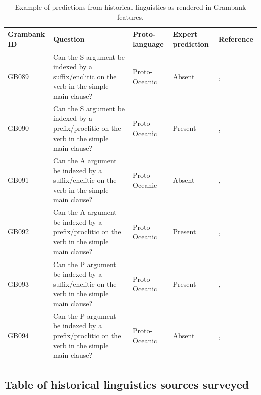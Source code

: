 \documentclass[a4paper,10pt]{article} %
\begin{document}
\begin{table}[H] %
\centering
\caption{Example of predictions from historical linguistics as rendered in Grambank features.}
\label{example_HL_prediction_table}
\begin{tabular}{|l| p{3cm}|  p{3cm}| p{3cm} | p{3cm} |}
\hline
\textbf{Grambank ID} & \textbf{Question} & \textbf{Proto-language} & \textbf{Expert prediction}& \textbf{Reference} \\ \hline
GB089  &Can the S argument be indexed by a suffix/enclitic on the verb in the simple main clause? &Proto-Oceanic &Absent & \citet[498-499]{ross2004morphosyntactic}, \citet[83]{lynchrosscrowley_proto_grammar_oceanic} \\ \hline
GB090 &Can the S argument be indexed by a prefix/proclitic on the verb in the simple main clause? &Proto-Oceanic &Present &\citet[498-499]{ross2004morphosyntactic}, \citet[83]{lynchrosscrowley_proto_grammar_oceanic}  \\ \hline
GB091 &Can the A argument be indexed by a suffix/enclitic on the verb in the simple main clause? &Proto-Oceanic &Absent &\citet[498-499]{ross2004morphosyntactic}, \citet[83]{lynchrosscrowley_proto_grammar_oceanic} \\ \hline
GB092  &Can the A argument be indexed by a prefix/proclitic on the verb in the simple main clause? &Proto-Oceanic &Present &\citet[498-499]{ross2004morphosyntactic}, \citet[83]{lynchrosscrowley_proto_grammar_oceanic}  \\ \hline
GB093  &Can the P argument be indexed by a suffix/enclitic on the verb in the simple main clause? &Proto-Oceanic &Present &\citet[498-499]{ross2004morphosyntactic}, \citet[83]{lynchrosscrowley_proto_grammar_oceanic} \\ \hline
GB094  &Can the P argument be indexed by a prefix/proclitic on the verb in the simple main clause? &Proto-Oceanic &Absent & \citet[498-499]{ross2004morphosyntactic}, \citet[83]{lynchrosscrowley_proto_grammar_oceanic} \\ \hline
\end{tabular}
\end{table}

\subsection{Table of historical linguistics sources surveyed}
\label{supp:proto_lg_coding_table}
\end{document}
